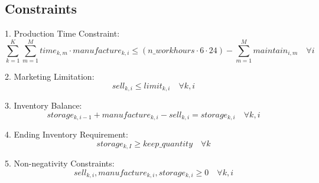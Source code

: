 \documentclass{article}
\begin{document}
\subsection*{Constraints}
1. Production Time Constraint:
\[
\sum_{k=1}^{K} \sum_{m=1}^{M} time_{k,m} \cdot manufacture_{k,i} \leq (n\_workhours \cdot 6 \cdot 24) - \sum_{m=1}^{M} maintain_{i,m} \quad \forall i
\]

2. Marketing Limitation:
\[
sell_{k,i} \leq limit_{k,i} \quad \forall k, i
\]

3. Inventory Balance:
\[
storage_{k,i-1} + manufacture_{k,i} - sell_{k,i} = storage_{k,i} \quad \forall k, i
\]

4. Ending Inventory Requirement:
\[
storage_{k,I} \geq keep\_quantity \quad \forall k
\]

5. Non-negativity Constraints:
\[
sell_{k,i}, manufacture_{k,i}, storage_{k,i} \geq 0 \quad \forall k, i
\]
\end{document}
